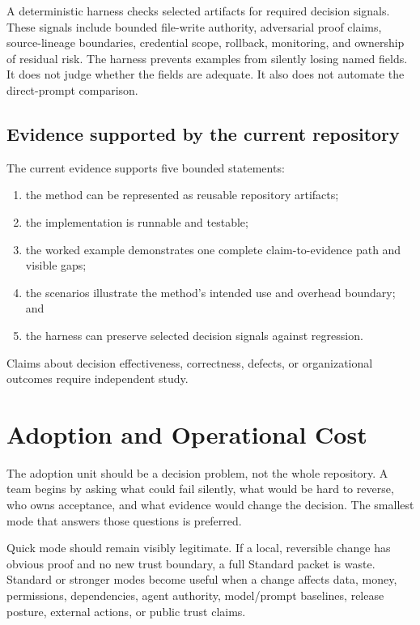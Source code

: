 \documentclass[11pt]{article}
\begin{document}
A deterministic harness checks selected artifacts for required decision signals. These signals include bounded file-write authority, adversarial proof claims, source-lineage boundaries, credential scope, rollback, monitoring, and ownership of residual risk. The harness prevents examples from silently losing named fields. It does not judge whether the fields are adequate. It also does not automate the direct-prompt comparison.

\subsection{Evidence supported by the current repository}

The current evidence supports five bounded statements:

\begin{enumerate}
  \item the method can be represented as reusable repository artifacts;
  \item the implementation is runnable and testable;
  \item the worked example demonstrates one complete claim-to-evidence path and visible gaps;
  \item the scenarios illustrate the method's intended use and overhead boundary; and
  \item the harness can preserve selected decision signals against regression.
\end{enumerate}

Claims about decision effectiveness, correctness, defects, or organizational outcomes require independent study.

\section{Adoption and Operational Cost}
\label{sec:adoption}

The adoption unit should be a decision problem, not the whole repository. A team begins by asking what could fail silently, what would be hard to reverse, who owns acceptance, and what evidence would change the decision. The smallest mode that answers those questions is preferred.

Quick mode should remain visibly legitimate. If a local, reversible change has obvious proof and no new trust boundary, a full Standard packet is waste. Standard or stronger modes become useful when a change affects data, money, permissions, dependencies, agent authority, model/prompt baselines, release posture, external actions, or public trust claims.
\end{document}

